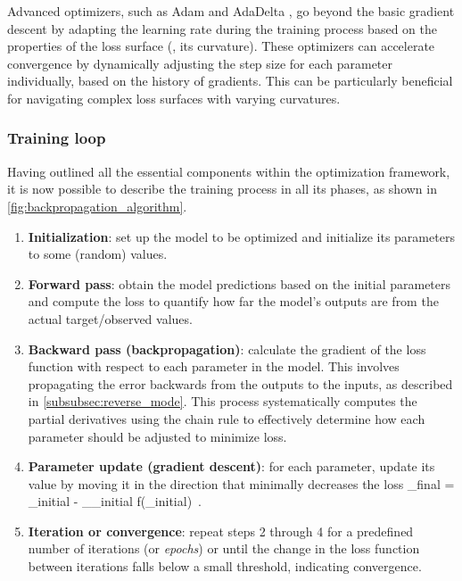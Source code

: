 Advanced optimizers, such as Adam \citep{kingma_adam_2017} and AdaDelta \citep{zeiler_adadelta_2012}, go beyond the basic gradient descent by adapting the learning rate during the training process based on the properties of the loss surface (\eg, its curvature). These optimizers can accelerate convergence by dynamically adjusting the step size for each parameter individually, based on the history of gradients. This can be particularly beneficial for navigating complex loss surfaces with varying curvatures.


\subsubsection{Training loop}
\label{subsubsec:training_loop}
Having outlined all the essential components within the optimization framework, it is now possible to describe the training process in all its phases, as shown in \cref{fig:backpropagation_algorithm}.
\begin{enumerate}
    \item \textbf{Initialization}: set up the model to be optimized and initialize its parameters to some (random) values.
    \item \textbf{Forward pass}: obtain the model predictions based on the initial parameters and compute the loss to quantify how far the model's outputs are from the actual target/observed values.
    \item \textbf{Backward pass (backpropagation)}: calculate the gradient of the loss function with respect to each parameter in the model. This involves propagating the error backwards from the outputs to the inputs, as described in \cref{subsubsec:reverse_mode}. This process systematically computes the partial derivatives using the chain rule to effectively determine how each parameter should be adjusted to minimize loss.
    \item \textbf{Parameter update (gradient descent)}: for each parameter, update its value by moving it in the direction that minimally decreases the loss
    \be
    \label{eq:4.12}
    \va{\t}_{final} = \va{\t}_{initial} - \eta \va{\nabla}_{\va{\t}_{initial}} f(\va{\t}_{initial}) \,.
    \ee
    \item \textbf{Iteration or convergence}: repeat steps 2 through 4 for a predefined number of iterations (or \emph{epochs}) or until the change in the loss function between iterations falls below a small threshold, indicating convergence.
\end{enumerate}

